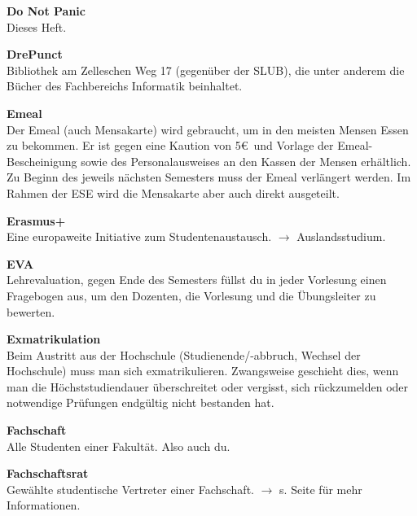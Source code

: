 \begin{multicols}{2}
\vfill\columnbreak

\textbf{Do Not Panic} \\
Dieses Heft.

\textbf{DrePunct} \\
Bibliothek am Zelleschen Weg 17 (gegenüber der SLUB), die unter anderem die Bücher des Fachbereichs Informatik beinhaltet.

\textbf{Emeal} \\
Der Emeal (auch Mensakarte) wird gebraucht, um in den meisten Mensen Essen zu bekommen.
Er ist gegen eine Kaution von 5\euro\ und Vorlage der Emeal-Bescheinigung sowie des Personalausweises an den Kassen der Mensen erhältlich.
Zu Beginn des jeweils nächsten Semesters muss der Emeal verlängert werden.
Im Rahmen der ESE wird die Mensakarte aber auch direkt ausgeteilt.

\textbf{Erasmus+} \\
Eine europaweite Initiative zum Studentenaustausch.
$\rightarrow$ Auslandsstudium.

\textbf{EVA} \\
Lehrevaluation, gegen Ende des Semesters füllst du in jeder Vorlesung einen Fragebogen aus, um den Dozenten, die Vorlesung und die Übungsleiter zu bewerten.

\textbf{Exmatrikulation} \\
Beim Austritt aus der Hochschule (Studienende/-abbruch, Wechsel der Hochschule) muss man sich exmatrikulieren.
Zwangsweise geschieht dies, wenn man die Höchststudiendauer überschreitet oder vergisst, sich rückzumelden oder notwendige Prüfungen endgültig nicht bestanden hat.

\textbf{Fachschaft} \\
Alle Studenten einer Fakultät. Also auch du.

\vfill\columnbreak

\textbf{Fachschaftsrat} \\
Gewählte studentische Vertreter einer Fachschaft. $\rightarrow$ s. Seite \pageref{sec:fachschaftsrat} für mehr Informationen.



\end{multicols}
